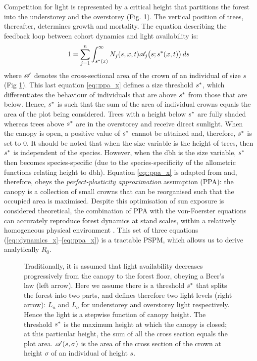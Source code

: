 Competition for light is represented by a critical height that partitions the forest into the understorey and the overstorey (Fig. \ref{fig::ppa}). The vertical position of trees, thereafter, determines growth and mortality. The equation describing the feedback loop between cohort dynamics and light availability is:
\begin{equation}
	1 = \sum_{j = 1}^{n} \int_{{s}^{*}(x)}^{\infty} N_j(s, x, t) \mathscr{A}_j \big(s; {s}^{*}(x, t)\big) \, ds \label{eq::ppa_x}
\end{equation}
where $ \mathscr{A} $ denotes the cross-sectional area of the crown of an individual of size $ s $ (Fig \ref{fig::ppa}). This last equation \eqref{eq::ppa_x} defines a size threshold $ {s}^{*} $, which differentiates the behaviour of individuals that are above $ {s}^{*} $ from those that are below. Hence, $ {s}^{*} $ is such that the sum of the area of individual crowns equals the area of the plot being considered. Trees with a height below $ {s}^{*} $ are fully shaded whereas trees above $ {s}^{*} $ are in the overstorey and receive direct sunlight. When the canopy is open, a positive value of $ {s}^{*} $ cannot be attained and, therefore, $ {s}^{*} $ is set to $ 0 $. It should be noted that when the size variable is the height of trees, then $ {s}^{*} $ is independent of the species. However, when the dbh is the size variable, $ {s}^{*} $ then becomes species-specific (due to the species-specificity of the allometric functions relating height to dbh). Equation \eqref{eq::ppa_x} is adapted from \citet{Strigul2008} and, therefore, obeys the \textit{perfect-plasticity approximation} assumption (PPA): the canopy is a collection of small crowns that can be reorganised such that the occupied area is maximised. Despite this optimisation of sun exposure is considered theoretical, the combination of PPA with the von-Foerster equations can accurately reproduce forest dynamics at stand scales, within a relatively homogeneous physical environment \citep{Strigul2008, Purves2008}. This set of three equations (\ref{eq::dynamics_x}--\ref{eq::ppa_x}) is a tractable PSPM, which allows us to derive analytically $ R_0 $.

\begin{figure}
	\centering
	
	\caption{Traditionally, it is assumed that light availability decreases progressively from the canopy to the forest floor, obeying a Beer's law (left arrow). Here we assume there is a threshold $ {s}^{*} $ that splits the forest into two parts, and defines therefore two light levels (right arrow): $ L_u $ and $ L_o $ for understorey and overstorey light respectively. Hence the light is a stepwise function of canopy height. The threshold $ {s}^{*} $ is the maximum height at which the canopy is closed; at this particular height, the sum of all the cross section equals the plot area. $ \mathscr{A}(s, \sigma) $ is the area of the cross section of the crown at height $ \sigma $ of an individual of height $ s $. \label{fig::ppa}}
\end{figure}

